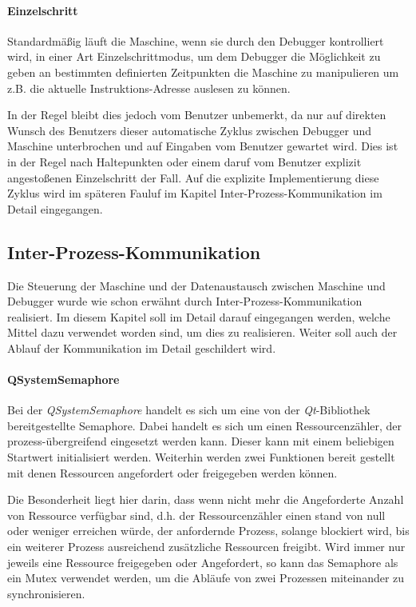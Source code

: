 \paragraph{Einzelschritt}
Standardmäßig läuft die Maschine, wenn sie durch den Debugger kontrolliert wird, in einer Art Einzelschrittmodus, um dem Debugger die Möglichkeit zu geben an bestimmten definierten Zeitpunkten die Maschine zu manipulieren um z.B. die aktuelle Instruktions-Adresse auslesen zu können.

In der Regel bleibt dies jedoch vom Benutzer unbemerkt, da nur auf direkten Wunsch des Benutzers dieser automatische Zyklus zwischen Debugger und Maschine unterbrochen und auf Eingaben vom Benutzer gewartet wird. Dies ist in der Regel nach Haltepunkten oder einem daruf vom Benutzer explizit angestoßenen Einzelschritt der Fall. Auf die explizite Implementierung diese Zyklus wird im späteren Fauluf im Kapitel Inter-Prozess-Kommunikation im Detail eingegangen.

\subsection{Inter-Prozess-Kommunikation}

Die Steuerung der Maschine und der Datenaustausch zwischen Maschine und Debugger wurde wie schon erwähnt durch Inter-Prozess-Kommunikation realisiert. Im diesem Kapitel soll im Detail darauf eingegangen werden, welche Mittel dazu verwendet worden sind, um dies zu realisieren. Weiter soll auch der Ablauf der Kommunikation im Detail geschildert wird.

\paragraph{QSystemSemaphore}
Bei der \emph{QSystemSemaphore} handelt es sich um eine von der \emph{Qt}-Bibliothek bereitgestellte Semaphore. Dabei handelt es sich um einen Ressourcenzähler, der prozess-übergreifend eingesetzt werden kann. Dieser kann mit einem beliebigen Startwert initialisiert werden. Weiterhin werden zwei Funktionen bereit gestellt mit denen Ressourcen angefordert  oder freigegeben werden können.

Die Besonderheit liegt hier darin, dass wenn nicht mehr die Angeforderte Anzahl von Ressource verfügbar sind, d.h. der Ressourcenzähler einen stand von null oder weniger erreichen würde, der anfordernde Prozess, solange blockiert wird, bis ein weiterer Prozess ausreichend zusätzliche Ressourcen freigibt.  Wird immer nur jeweils eine Ressource freigegeben oder Angefordert, so kann das Semaphore als ein Mutex verwendet werden, um die Abläufe von zwei Prozessen miteinander zu synchronisieren.

